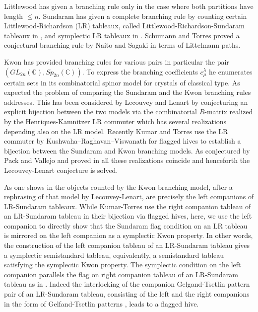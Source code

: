 \documentclass[reqno]{amsart}
\theoremstyle{tplain}
\begin{document}
Littlewood \cite{littlewood} has given a branching rule only in the case where both partitions have length $\le n$. Sundaram has given a complete branching rule \cite{sundaram, sundaram90} by counting certain Littlewood-Richardson (LR) tableaux, called  Littlewood-Richardson-Sundaram tableaux in \cite{leclen,sathishtorres}, and symplectic LR tableaux in \cite{watanabe}.
Schumann and Torres \cite{schumanntorres} proved a conjectural branching rule by Naito and Sagaki \cite{naitosagaki} in terms of Littelmann
paths.

Kwon \cite{kwon18} has provided branching rules for various pairs in particular the pair $(GL_{2n}(\mathbb{C}),Sp_{2n}(\mathbb{C}))$. To express the branching coefficients $c^\lambda_\mu$ he enumerates certain sets in  its
combinatorial spinor model \cite{kwon} for crystals of classical type. As expected   the problem of comparing the Sundaram and the Kwon branching rules  addresses. This has been considered by Lecouvey and Lenart \cite{leclen} by conjecturing an explicit bijection  between the two models via the combinatorial $R$-matrix realized by the Henriques-Kamnitzer LR commuter \cite{HK2,HenKam} which has several realizations \cite{knutson, fultonbuch,tyong2,akt16, az18v5,tka18, azkoma25,az18v5} depending also on the LR model.
Recently Kumar and Torres \cite{sathishtorres} use the LR commuter
  by Kushwaha–Raghavan–Viswanath for flagged hives \cite{krv21,krsv24} to establish a bijection between the Sundaram and Kwon branching models.
As conjectured by Pack and Vallejo \cite{pakvallejo} and proved in \cite{pakvallejo,DK08,akt16, azkoma25, az18v5} all these realizations coincide and henceforth the Lecouvey-Lenart conjecture \cite{leclen} is solved.

As  one shows in \cite{az18v5} the objects counted by the Kwon branching model, after a rephrasing of that model by Lecouvey-Lenart, are precisely the left companions of  LR-Sundaram tableaux. While Kumar-Torres use the right companion tableau of an  LR-Sundaram tableau in their bijection via flagged hives,  here, we use the left companion to  directly  show that   the Sundaram flag condition on an LR tableau   is mirrored on the left companion as a  symplectic Kwon property. In other words, the construction of the left companion tableau of an LR-Sundaram tableau gives a symplectic semistandard tableau, equivalently, a semistandard tableau satisfying the symplectic Kwon property. The symplectic condition on the left companion parallels the flag on   right companion tableau \cite{sathishtorres} of an LR-Sundaram tableau as in \cite{sathishtorres}. Indeed the interlocking of the companion Gelgand-Tsetlin pattern pair of an LR-Sundaram tableau, consisting of the left and the right companions in the form of Gelfand-Tsetlin patterns  \cite{gt50},
leads to a flagged hive.
\end{document}
